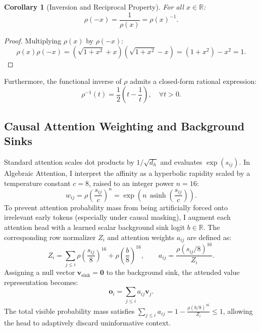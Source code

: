 \documentclass[11pt,a4paper]{article}
\newtheorem{corollary}[theorem]{Corollary}
\theoremstyle{definition}
\newcommand{\asinh}{\operatorname{asinh}}
\begin{document}
\begin{corollary}[Inversion and Reciprocal Property]
For all $x \in \mathbb{R}$:
\begin{equation}
\label{eq:rho_neg}
\rho(-x) = \frac{1}{\rho(x)} = \rho(x)^{-1}.
\end{equation}
\end{corollary}
\begin{proof}
Multiplying $\rho(x)$ by $\rho(-x)$:
\begin{equation}
\rho(x) \rho(-x) = \left(\sqrt{1+x^2} + x\right)\left(\sqrt{1+x^2} - x\right) = (1 + x^2) - x^2 = 1.
\end{equation}
\end{proof}
Furthermore, the functional inverse of $\rho$ admits a closed-form rational expression:
\begin{equation}
\label{eq:rho_inv}
\rho^{-1}(t) = \frac{1}{2}\left(t - \frac{1}{t}\right), \quad \forall t > 0.
\end{equation}

\subsection{Causal Attention Weighting and Background Sinks}
\label{subsec:causal_sink}

Standard attention scales dot products by $1/\sqrt{d_h}$ and evaluates $\exp(s_{ij})$. In Algebraic Attention, I interpret the affinity as a hyperbolic rapidity scaled by a temperature constant $c = 8$, raised to an integer power $n = 16$:
\begin{equation}
w_{ij} = \rho\left(\frac{s_{ij}}{c}\right)^n = \exp\left(n \, \asinh\left(\frac{s_{ij}}{c}\right)\right).
\end{equation}
To prevent attention probability mass from being artificially forced onto irrelevant early tokens (especially under causal masking), I augment each attention head with a learned scalar background sink logit $b \in \mathbb{R}$. The corresponding row normalizer $Z_i$ and attention weights $a_{ij}$ are defined as:
\begin{equation}
\label{eq:normalizer_sink}
Z_i = \sum_{j \le i} \rho\left(\frac{s_{ij}}{8}\right)^{16} + \rho\left(\frac{b}{8}\right)^{16}, \qquad a_{ij} = \frac{\rho\left(s_{ij}/8\right)^{16}}{Z_i}.
\end{equation}
Assigning a null vector $\mathbf{v}_{\text{sink}} = \mathbf{0}$ to the background sink, the attended value representation becomes:
\begin{equation}
\mathbf{o}_i = \sum_{j \le i} a_{ij} \mathbf{v}_j.
\end{equation}
The total visible probability mass satisfies $\sum_{j \le i} a_{ij} = 1 - \frac{\rho(b/8)^{16}}{Z_i} \le 1$, allowing the head to adaptively discard uninformative context.
\end{document}
